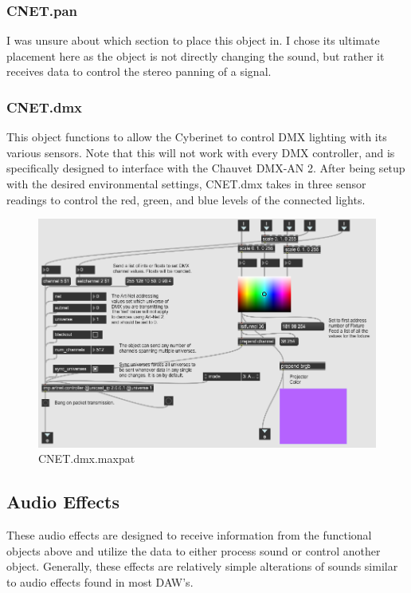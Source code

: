 \subsubsection{CNET.pan}
I was unsure about which section to place this object in. I chose its ultimate placement here as the object is not directly changing the sound, but rather it receives data to control the stereo panning of a signal.

\subsubsection{CNET.dmx}
This object functions to allow the Cyberinet to control DMX lighting with its various sensors. Note that this will not work with every DMX controller, and is specifically designed to interface with the Chauvet DMX-AN 2. After being setup with the desired environmental settings, CNET.dmx takes in three sensor readings to control the red, green, and blue levels of the connected lights.

\begin{figure}
    \centering
    \includegraphics[scale=0.85]{diagrams/maxPatches/CNET.dmx.png}
    \caption{CNET.dmx.maxpat}
    \label{fig:CNET.dmx.maxpat}
\end{figure}

\subsection{Audio Effects}
These audio effects are designed to receive information from the functional objects above and utilize the data to either process sound or control another object. Generally, these effects are relatively simple alterations of sounds similar to audio effects found in most DAW's.

